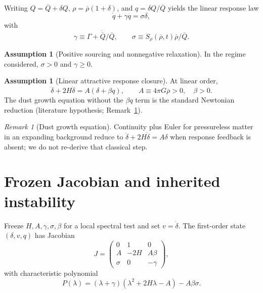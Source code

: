 \documentclass[11pt]{article}
\theoremstyle{definition}
\newtheorem{assumption}[theorem]{Assumption}
\theoremstyle{remark}
\newtheorem{remark}[theorem]{Remark}
\newcommand{\Qbar}{\overline{Q}}
\newcommand{\rhobar}{\overline{\rho}}
\begin{document}
Writing $Q=\Qbar+\delta Q$, $\rho=\rhobar(1+\delta)$, and $q=\delta Q/\Qbar$ yields the linear response law
\begin{equation}
\label{eq:qlinear}
\boxed{\dot q+\gamma q=\sigma\delta,}
\end{equation}
with
\begin{equation}
\gamma\equiv\Gamma+\dot{\Qbar}/\Qbar,
\qquad
\sigma\equiv S_\rho(\rhobar,t)\rhobar/\Qbar.
\end{equation}

\begin{assumption}[Positive sourcing and nonnegative relaxation]
\label{ass:signs}
In the regime considered, $\sigma>0$ and $\gamma\ge0$.
\end{assumption}

\begin{assumption}[Linear attractive response closure]
\label{ass:closure}
At linear order,
\begin{equation}
\label{eq:deltamain}
\boxed{
\ddot\delta+2H\dot\delta=A(\delta+\beta q),
\qquad
A\equiv4\pi G\rhobar>0,\quad\beta>0.
}
\end{equation}
The dust growth equation without the $\beta q$ term is the standard Newtonian reduction (literature hypothesis; Remark~\ref{rem:dust}).
\end{assumption}

\begin{remark}[Dust growth equation]
\label{rem:dust}
Continuity plus Euler for pressureless matter in an expanding background reduce to $\ddot\delta+2H\dot\delta=A\delta$ when response feedback is absent; we do not re-derive that classical step.
\end{remark}

\section{Frozen Jacobian and inherited instability}
\label{sec:jacobian}
Freeze $H,A,\gamma,\sigma,\beta$ for a local spectral test and set $v=\dot\delta$.
The first-order state $(\delta,v,q)$ has Jacobian
\begin{equation}
\label{eq:J}
J=
\begin{pmatrix}
0&1&0\\
A&-2H&A\beta\\
\sigma&0&-\gamma
\end{pmatrix},
\end{equation}
with characteristic polynomial
\begin{equation}
\label{eq:poly}
P(\lambda)=(\lambda+\gamma)(\lambda^2+2H\lambda-A)-A\beta\sigma.
\end{equation}
\end{document}
